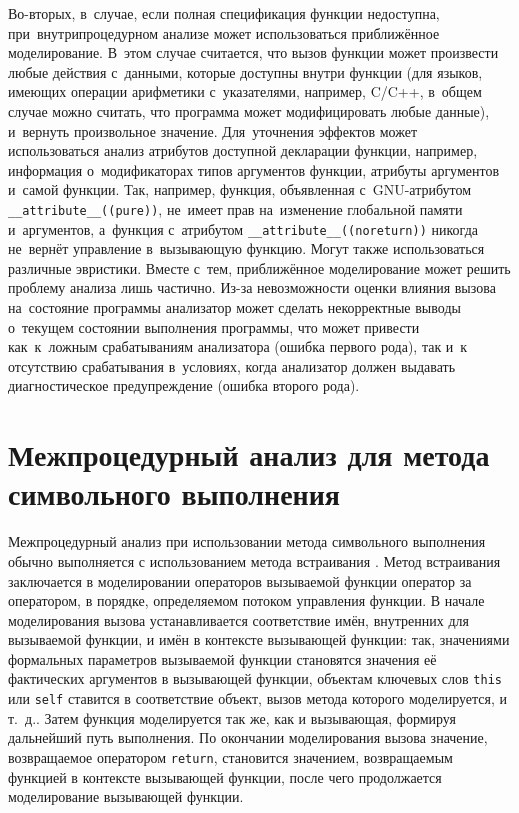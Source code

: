 Во-вторых, в~случае, если полная спецификация функции недоступна, при~внутрипроцедурном анализе может использоваться приближённое моделирование. В~этом случае считается, что вызов функции может произвести любые действия с~данными, которые доступны внутри функции (для языков, имеющих операции арифметики с~указателями, например, C/C++, в~общем случае можно считать, что программа может модифицировать любые данные), и~вернуть произвольное значение. Для~уточнения эффектов может использоваться анализ атрибутов доступной декларации функции, например, информация о~модификаторах типов аргументов функции, атрибуты аргументов и~самой функции. Так, например, функция, объявленная с~GNU-атрибутом \texttt{\_\_attribute\_\_((pure))}, не~имеет прав на~изменение глобальной памяти и~аргументов, а~функция с~атрибутом \texttt{\_\_attribute\_\_((noreturn))} никогда не~вернёт управление в~вызывающую функцию. Могут также использоваться различные эвристики. Вместе с~тем, приближённое моделирование может решить проблему анализа лишь частично. Из-за невозможности оценки влияния вызова на~состояние программы анализатор может сделать некорректные выводы о~текущем состоянии выполнения программы, что может привести как~к~ложным срабатываниям анализатора (ошибка первого рода), так и~к отсутствию срабатывания в~условиях, когда анализатор должен выдавать диагностическое предупреждение (ошибка второго рода).


\section{Межпроцедурный анализ для метода символьного выполнения}

Межпроцедурный анализ при использовании метода символьного выполнения обычно выполняется с использованием метода встраивания \cite{???}. Метод встраивания заключается в моделировании операторов вызываемой функции оператор за оператором, в порядке, определяемом потоком управления функции. В начале моделирования вызова устанавливается соответствие имён, внутренних для вызываемой функции, и имён в контексте вызывающей функции: так, значениями формальных параметров вызываемой функции становятся значения её фактических аргументов в вызывающей функции, объектам ключевых слов \texttt{this} или \texttt{self} ставится в соответствие объект, вызов метода которого моделируется, и т.~д.. Затем функция моделируется так же, как и вызывающая, формируя дальнейший путь выполнения. По окончании моделирования вызова значение, возвращаемое оператором \texttt{return}, становится значением, возвращаемым функцией в контексте вызывающей функции, после чего продолжается моделирование вызывающей функции.

